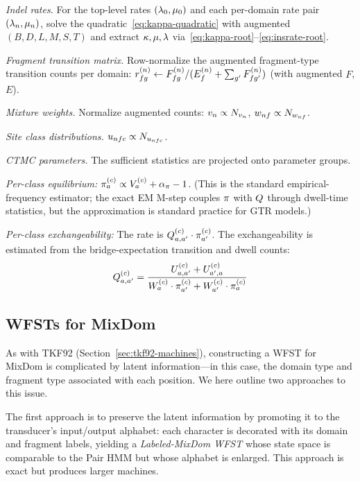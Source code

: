 \emph{Indel rates.}
For the top-level rates $(\lambda_0, \mu_0)$ and each
per-domain rate pair $(\lambda_n, \mu_n)$,
solve the quadratic~\eqref{eq:kappa-quadratic} with augmented
$(B, D, L, M, S, T)$ and extract $\kappa,\mu,\lambda$ via~\eqref{eq:kappa-root}--\eqref{eq:insrate-root}.

\emph{Fragment transition matrix.}
Row-normalize the augmented fragment-type transition counts per domain:
$r^{(n)}_{fg} \leftarrow F^{(n)}_{fg} / (E^{(n)}_f + \sum_{g'} F^{(n)}_{fg'})$
(with augmented $F$, $E$).

\emph{Mixture weights.}
Normalize augmented counts:
$v_n \propto N_{v_n}$,
$w_{nf} \propto N_{w_{nf}}$.

\emph{Site class distributions.}
$u_{nfc} \propto N_{u_{nfc}}$.

\emph{CTMC parameters.}
The sufficient statistics are projected onto parameter groups.

\emph{Per-class equilibrium:}
$\pi^{(c)}_a \propto V^{(c)}_a + \alpha_\pi - 1$.
(This is the standard empirical-frequency estimator; the exact EM M-step
couples $\pi$ with $Q$ through dwell-time statistics, but the approximation
is standard practice for GTR models.)

\emph{Per-class exchangeability:}
The rate is $Q^{(c)}_{a,a'} \cdot \pi^{(c)}_{a'}$.
The exchangeability is estimated from the bridge-expectation transition and dwell counts:
\[
Q^{(c)}_{a,a'}
= \frac{U^{(c)}_{a,a'} + U^{(c)}_{a',a}}
       {W^{(c)}_a \cdot \pi^{(c)}_{a'} + W^{(c)}_{a'} \cdot \pi^{(c)}_a}
\]

\subsection{WFSTs for MixDom}
\label{sec:mixdom-wfst}

As with TKF92 (Section~\ref{sec:tkf92-machines}),
constructing a WFST for MixDom is complicated by latent information---in this case,
the domain type and fragment type associated with each position.
We here outline two approaches to this issue.

The first approach is to preserve the latent information by promoting it to the transducer's input/output alphabet:
each character is decorated with its domain and fragment labels,
yielding a \emph{Labeled-MixDom WFST} whose state space is comparable to the Pair HMM
but whose alphabet is enlarged.
This approach is exact but produces larger machines.

